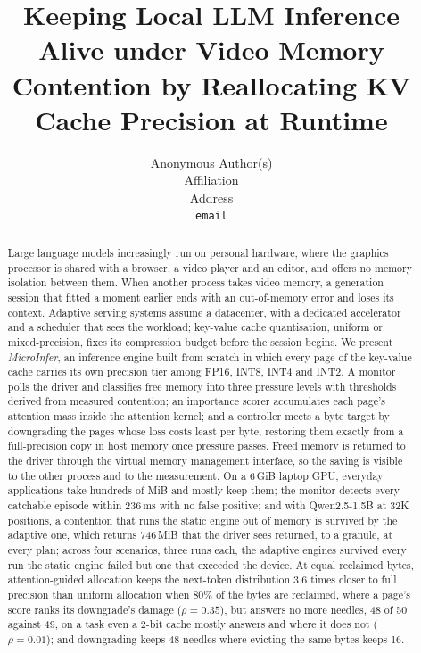 \documentclass{article}
\title{Keeping Local LLM Inference Alive under Video Memory Contention by
Reallocating KV Cache Precision at Runtime}
\author{%
  Anonymous Author(s) \\
  Affiliation \\
  Address \\
  \texttt{email} \\
}
\begin{document}
\maketitle

\begin{abstract}
Large language models increasingly run on personal hardware, where the graphics
processor is shared with a browser, a video player and an editor, and offers no
memory isolation between them. When another process takes video memory, a
generation session that fitted a moment earlier ends with an out-of-memory
error and loses its context. Adaptive serving systems assume a datacenter, with
a dedicated accelerator and a scheduler that sees the workload; key-value cache
quantisation, uniform or mixed-precision, fixes its compression budget before
the session begins. We present \textit{MicroInfer}, an inference engine built
from scratch in which every page of the key-value cache carries its own
precision tier among FP16, INT8, INT4 and INT2. A monitor polls the driver and
classifies free memory into three pressure levels with thresholds derived from
measured contention; an importance scorer accumulates each page's attention
mass inside the attention kernel; and a controller meets a byte target by
downgrading the pages whose loss costs least per byte, restoring them exactly
from a full-precision copy in host memory once pressure passes. Freed memory is
returned to the driver through the virtual memory management interface, so the
saving is visible to the other process and to the measurement. On a 6\,GiB
laptop GPU, everyday applications take hundreds of MiB and mostly keep them;
the monitor detects every catchable episode within 236\,ms with no false
positive; and with Qwen2.5-1.5B at 32K positions, a contention that runs the
static engine out of memory is survived by the adaptive one, which returns
746\,MiB that the driver sees returned, to a granule, at every plan; across
four scenarios, three runs each, the adaptive engines survived every run the
static engine failed but one that exceeded the device. At equal
reclaimed bytes, attention-guided allocation keeps the next-token distribution
3.6 times closer to full precision than uniform allocation when 80\% of the
bytes are reclaimed, where a page's score ranks its downgrade's damage
($\rho = 0.35$), but answers no more needles, 48 of 50 against 49, on a task
even a 2-bit cache mostly answers and where it does not ($\rho = 0.01$); and
downgrading keeps 48 needles where evicting the same bytes keeps 16.
\end{abstract}
\end{document}
